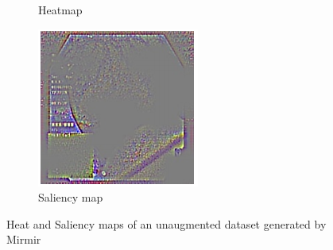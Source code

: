 \begin{figure}
\begin{subfigure}[t]{0.3\textwidth}
         \caption{Heatmap}
         \label{fig:sal2}
     \end{subfigure}     
     \hfill
     \begin{subfigure}[t]{0.3\textwidth}
         \centering
         \includegraphics[width=\textwidth]{methodology/figures/sal3.png}
         \caption{Saliency map}
         \label{fig:sal3}
     \end{subfigure}
     \caption{Heat and Saliency maps of an unaugmented dataset generated by Mirmir}
     \label{fig:Saliencymasks}
\end{figure}

